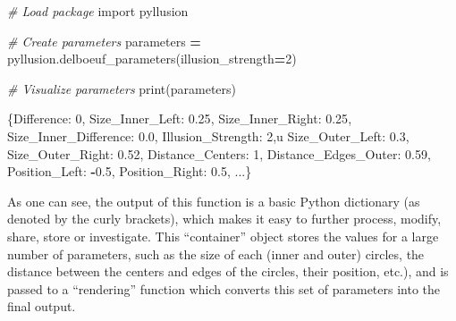 \documentclass[
  english,
  man,floatsintext]{apa6}
\newenvironment{Shaded}{\begin{snugshade}}{\end{snugshade}}
\newcommand{\BuiltInTok}[1]{#1}
\newcommand{\CommentTok}[1]{\textcolor[rgb]{0.56,0.35,0.01}{\textit{#1}}}
\newcommand{\DecValTok}[1]{\textcolor[rgb]{0.00,0.00,0.81}{#1}}
\newcommand{\FloatTok}[1]{\textcolor[rgb]{0.00,0.00,0.81}{#1}}
\newcommand{\ImportTok}[1]{#1}
\newcommand{\NormalTok}[1]{#1}
\newcommand{\OperatorTok}[1]{\textcolor[rgb]{0.81,0.36,0.00}{\textbf{#1}}}
\newcommand{\StringTok}[1]{\textcolor[rgb]{0.31,0.60,0.02}{#1}}
\begin{document}
\begin{Shaded}
\begin{Highlighting}[]
\CommentTok{\# Load package}
\ImportTok{import}\NormalTok{ pyllusion}

\CommentTok{\# Create parameters}
\NormalTok{parameters }\OperatorTok{=}\NormalTok{ pyllusion.delboeuf\_parameters(illusion\_strength}\OperatorTok{=}\DecValTok{2}\NormalTok{)}

\CommentTok{\# Visualize parameters}
\BuiltInTok{print}\NormalTok{(parameters)}
\end{Highlighting}
\end{Shaded}

\begin{Shaded}
\begin{Highlighting}[]
\NormalTok{\{}\StringTok{\textquotesingle{}Difference\textquotesingle{}}\NormalTok{: }\DecValTok{0}\NormalTok{,}
 \StringTok{\textquotesingle{}Size\_Inner\_Left\textquotesingle{}}\NormalTok{: }\FloatTok{0.25}\NormalTok{,}
 \StringTok{\textquotesingle{}Size\_Inner\_Right\textquotesingle{}}\NormalTok{: }\FloatTok{0.25}\NormalTok{,}
 \StringTok{\textquotesingle{}Size\_Inner\_Difference\textquotesingle{}}\NormalTok{: }\FloatTok{0.0}\NormalTok{,}
 \StringTok{\textquotesingle{}Illusion\_Strength\textquotesingle{}}\NormalTok{: }\DecValTok{2}\NormalTok{,u}
 \StringTok{\textquotesingle{}Size\_Outer\_Left\textquotesingle{}}\NormalTok{: }\FloatTok{0.3}\NormalTok{,}
 \StringTok{\textquotesingle{}Size\_Outer\_Right\textquotesingle{}}\NormalTok{: }\FloatTok{0.52}\NormalTok{,}
 \StringTok{\textquotesingle{}Distance\_Centers\textquotesingle{}}\NormalTok{: }\DecValTok{1}\NormalTok{,}
 \StringTok{\textquotesingle{}Distance\_Edges\_Outer\textquotesingle{}}\NormalTok{: }\FloatTok{0.59}\NormalTok{,}
 \StringTok{\textquotesingle{}Position\_Left\textquotesingle{}}\NormalTok{: }\OperatorTok{{-}}\FloatTok{0.5}\NormalTok{,}
 \StringTok{\textquotesingle{}Position\_Right\textquotesingle{}}\NormalTok{: }\FloatTok{0.5}\NormalTok{,}
\NormalTok{ ...\}}
\end{Highlighting}
\end{Shaded}

As one can see, the output of this function is a basic Python dictionary (as denoted by the curly brackets), which makes it easy to further process, modify, share, store or investigate. This ``container'' object stores the values for a large number of parameters, such as the size of each (inner and outer) circles, the distance between the centers and edges of the circles, their position, etc.), and is passed to a ``rendering'' function which converts this set of parameters into the final output.
\end{document}
